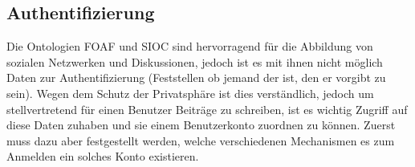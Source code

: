 
\subsection{Authentifizierung} %
\label{sub:authentifizierung}

Die Ontologien FOAF und SIOC sind hervorragend für die Abbildung von sozialen Netzwerken und Diskussionen, jedoch ist es mit ihnen nicht möglich Daten zur Authentifizierung (Feststellen ob jemand der ist, den er vorgibt zu sein). Wegen dem Schutz der Privatsphäre ist dies verständlich, jedoch um stellvertretend für einen Benutzer Beiträge zu schreiben, ist es wichtig Zugriff auf diese Daten zuhaben und sie einem Benutzerkonto zuordnen zu können. Zuerst muss dazu aber festgestellt werden, welche verschiedenen Mechanismen es zum Anmelden ein solches Konto existieren.

